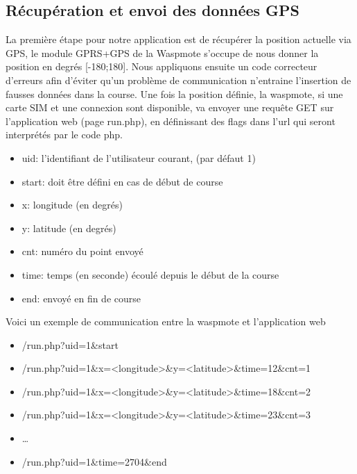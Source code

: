 \documentclass[a4paper,11pt]{article}
\begin{document}
\subsection{Récupération et envoi des données GPS}
La première étape pour notre application est de récupérer la position actuelle via GPS, le module GPRS+GPS de la Waspmote s'occupe de nous donner la position en degrés [-180;180].\newline
Nous appliquons ensuite un code correcteur d'erreurs afin d'éviter qu'un problème de communication n'entraine l'insertion de fausses données dans la course.\newline
Une fois la position définie, la waspmote, si une carte SIM et une connexion sont disponible, va envoyer une requête GET sur l'application web (page run.php), en définissant des flags dans l'url qui seront interprétés par le code php.
\begin{itemize}
\item uid: l'identifiant de l'utilisateur courant, (par défaut 1)
\item start: doit être défini en cas de début de course
\item x: longitude (en degrés)
\item y: latitude (en degrés)
\item cnt: numéro du point envoyé
\item time: temps (en seconde) écoulé depuis le début de la course
\item end: envoyé en fin de course
\end{itemize}
Voici un exemple de communication entre la waspmote et l'application web
\begin{itemize}
\item /run.php?uid=1\&start
\item /run.php?uid=1\&x=<longitude>\&y=<latitude>\&time=12\&cnt=1
\item /run.php?uid=1\&x=<longitude>\&y=<latitude>\&time=18\&cnt=2
\item /run.php?uid=1\&x=<longitude>\&y=<latitude>\&time=23\&cnt=3
\item \ldots
\item /run.php?uid=1\&time=2704\&end
\end{itemize}
\end{document}
